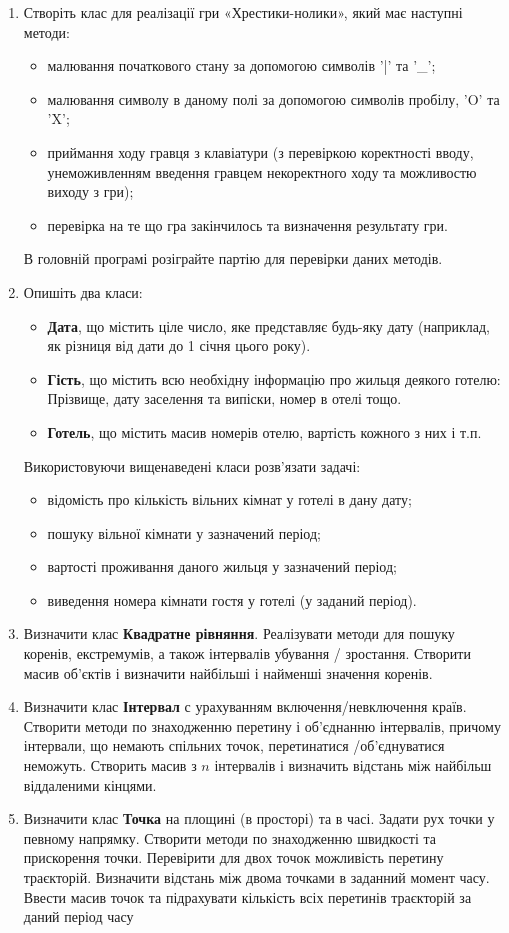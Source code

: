 \documentclass[a5paper,titlepage,openany,twoside,draft]{book_unv}%
\begin{document}
\begin{enumerate}
\item
Створіть клас для реалізації гри «Хрестики-нолики», який має наступні методи: 
\begin{itemize}
\item
малювання початкового стану за допомогою символів '|' та '\_'; 
\item
малювання символу в даному полі за допомогою символів пробілу, 'O' та 'X'; 
\item
приймання ходу гравця з клавіатури (з перевіркою коректності вводу, 
унеможивленням введення гравцем некоректного ходу та можливостю виходу з гри);
\item
перевірка на те що гра закінчилось та визначення результату гри. 
\end{itemize}
В головній програмі розіграйте партію для перевірки даних методів.

\item
Опишіть два класи:
\begin{itemize}
\item
\textbf{Дата}, що містить ціле число, яке представляє будь-яку дату
(наприклад, як різниця від дати до 1 січня цього року).
\item
\textbf{Гість}, що містить всю необхідну інформацію про жильця
деякого готелю: Прізвище, дату заселення та випіски, номер в отелі тощо.
\item
\textbf{Готель}, що містить масив номерів отелю, вартість кожного з них і т.п.
\end{itemize}
Використовуючи вищенаведені класи розв'язати задачі:
\begin{itemize}
\item відомість про кількість вільних кімнат у готелі в дану дату;
\item пошуку вільної кімнати у зазначений період;
\item вартості проживання даного жильця у зазначений період;
\item виведення номера кімнати гостя у готелі (у заданий період).
\end{itemize}

\item
Визначити клас \textbf{Квадратне рівняння}. Реалізувати методи для пошуку коренів,
екстремумів, а також інтервалів убування / зростання. Створити масив об'єктів і 
визначити найбільші і найменші значення коренів.
\item
Визначити клас \textbf{Інтервал} с урахуванням включення/невключення країв. 
Створити методи по знаходженню перетину і об'єднанню інтервалів, 
причому інтервали, що немають спільних точок, перетинатися /об'єднуватися неможуть. 
Створить масив з $n$ інтервалів і визначить відстань між найбільш віддаленими кінцями.

\item
Визначити клас \textbf{Точка} на площині (в просторі) та в часі. 
Задати рух точки у певному напрямку. Створити методи по знаходженню швидкості та прискорення точки. 
Перевірити для двох точок можливість перетину траєкторій. 
Визначити відстань між двома точками в заданний момент часу.
Ввести масив точок та підрахувати кількість всіх перетинів траєкторій за даний період часу

\end{enumerate}
\end{document}
